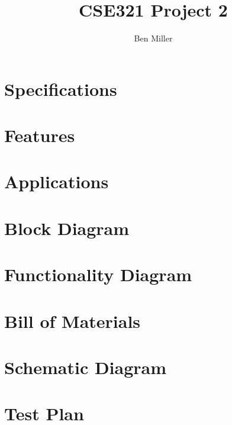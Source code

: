 \documentclass[10pt,a4paper]{article}
\author{Ben Miller}
\title{CSE321 Project 2}
\begin{document}
\maketitle
\pagebreak
\tableofcontents
\pagebreak
\section{Specifications}
\pagebreak
\section{Features}
\pagebreak
\section{Applications}
\pagebreak
\section{Block Diagram}
\pagebreak
\section{Functionality Diagram}
\pagebreak
\section{Bill of Materials}
\pagebreak
\section{Schematic Diagram}
\pagebreak
\section{Test Plan}
\end{document}
